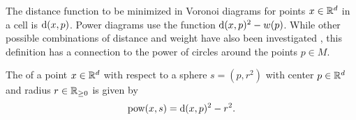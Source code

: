 The distance function to be minimized in Voronoi diagrams for points $x \in \mathbb{R}^d$ in a cell is $\operatorname{d}(x, p)$.
Power diagrams use the function $\operatorname{d}(x, p)^2 - w(p)$.
While other possible combinations of distance and weight have also been investigated \cite{aurenhammer1987power}, this definition has a connection to the power of circles around the points $p \in M$.

\begin{definition}
    \label{def:power}
    The  of a point $x \in \mathbb{R}^d$ with respect to a sphere $s = (p, r^2)$ with center $p \in \mathbb{R}^d$ and radius $r \in \mathbb{R}_{\geq 0}$ is given by
    \begin{align}
        \operatorname{pow}(x, s) = \operatorname{d}(x, p)^2 - r^2.
    \end{align}
\end{definition}
